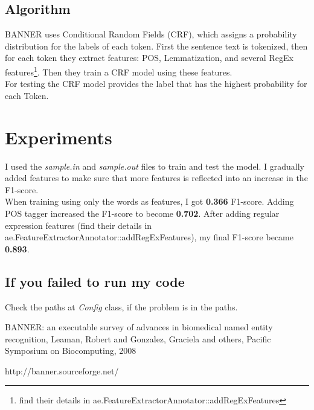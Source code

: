 \documentclass{article}
\begin{document}
\subsection{Algorithm}
BANNER \cite{banner} uses Conditional Random Fields (CRF), which assigns a probability distribution for the labels of each token. First the sentence text is tokenized, then for each token they extract features: POS, Lemmatization, and several RegEx features\footnote{find their details in ae.FeatureExtractorAnnotator::addRegExFeatures}. Then they train a CRF model using these features.\\

For testing the CRF model provides the label that has the highest probability for each Token.
\section{Experiments}

I used the \textit{sample.in} and \textit{sample.out} files to train and test the model. I gradually added features to make sure that more features is reflected into an increase in the F1-score.\\

When training using only the words as features, I got \textbf{0.366} F1-score. Adding POS tagger increased the F1-score to become \textbf{0.702}. After adding regular expression features (find their details in ae.FeatureExtractorAnnotator::addRegExFeatures), my final F1-score became \textbf{0.893}.

\subsection{If you failed to run my code}
Check the paths at \textit{Config} class, if the problem is in the paths.

\begin{thebibliography}{9}


BANNER: an executable survey of advances in biomedical named entity recognition,
Leaman, Robert and Gonzalez, Graciela and others,
  Pacific Symposium on Biocomputing,
  2008

  http://banner.sourceforge.net/

\end{thebibliography}
\end{document}
